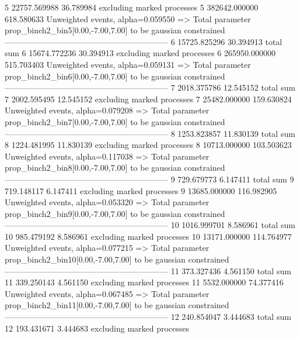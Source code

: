 5          22757.569988    36.789984       excluding marked processes    
5          382642.000000   618.580633      Unweighted events, alpha=0.059550
  => Total parameter prop_binch2_bin5[0.00,-7.00,7.00] to be gaussian constrained
------------------------------------------------------------
6          15725.825296    30.394913       total sum                     
6          15674.772236    30.394913       excluding marked processes    
6          265950.000000   515.703403      Unweighted events, alpha=0.059131
  => Total parameter prop_binch2_bin6[0.00,-7.00,7.00] to be gaussian constrained
------------------------------------------------------------
7          2018.375786     12.545152       total sum                     
7          2002.595495     12.545152       excluding marked processes    
7          25482.000000    159.630824      Unweighted events, alpha=0.079208
  => Total parameter prop_binch2_bin7[0.00,-7.00,7.00] to be gaussian constrained
------------------------------------------------------------
8          1253.823857     11.830139       total sum                     
8          1224.481995     11.830139       excluding marked processes    
8          10713.000000    103.503623      Unweighted events, alpha=0.117038
  => Total parameter prop_binch2_bin8[0.00,-7.00,7.00] to be gaussian constrained
------------------------------------------------------------
9          729.679773      6.147411        total sum                     
9          719.148117      6.147411        excluding marked processes    
9          13685.000000    116.982905      Unweighted events, alpha=0.053320
  => Total parameter prop_binch2_bin9[0.00,-7.00,7.00] to be gaussian constrained
------------------------------------------------------------
10         1016.999701     8.586961        total sum                     
10         985.479192      8.586961        excluding marked processes    
10         13171.000000    114.764977      Unweighted events, alpha=0.077215
  => Total parameter prop_binch2_bin10[0.00,-7.00,7.00] to be gaussian constrained
------------------------------------------------------------
11         373.327436      4.561150        total sum                     
11         339.250143      4.561150        excluding marked processes    
11         5532.000000     74.377416       Unweighted events, alpha=0.067485
  => Total parameter prop_binch2_bin11[0.00,-7.00,7.00] to be gaussian constrained
------------------------------------------------------------
12         240.854047      3.444683        total sum                     
12         193.431671      3.444683        excluding marked processes    
